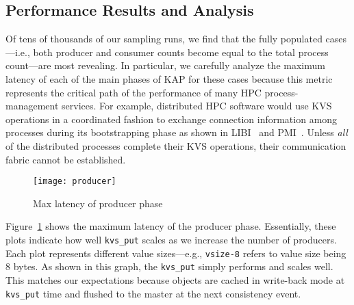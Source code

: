 \subsection{Performance Results and Analysis}
\label{results}
Of tens of thousands of our sampling runs, we find that the fully populated
cases---i.e., both producer and consumer counts become equal to the total
process count---are most revealing. In particular, we carefully analyze 
the maximum latency of each of the main phases of KAP for these cases 
because this metric represents the critical path of the performance of
many HPC process-management services. For example, distributed 
HPC software would use KVS operations in a coordinated fashion to exchange 
connection information among processes during its bootstrapping 
phase as shown in LIBI~\cite{LIBI} and PMI~\cite{PMI2}. Unless {\em all} 
of the distributed processes complete their
KVS operations, their communication fabric cannot be established. 

\begin{figure}
  \centering
  \texttt{[image: producer]}
  \caption{Max latency of producer phase}
  \vspace{-.4cm}	
  \label{fig:prod}
\end{figure}

Figure~\ref{fig:prod} shows the maximum latency of the producer phase.
Essentially, these plots indicate how well {\tt kvs\_put}
scales as we increase the number of producers. Each plot represents
different value sizes---e.g., {\tt vsize-8} refers to value size being
8 bytes. As shown in this graph, the {\tt kvs\_put} simply performs and
scales well. This matches our expectations because objects
are cached in write-back mode at {\tt kvs\_put} time and flushed to the
master at the next consistency event. 

%
%

